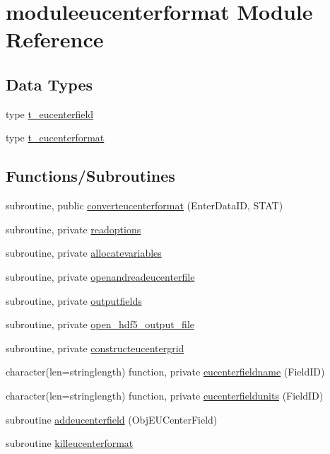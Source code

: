 \hypertarget{namespacemoduleeucenterformat}{}\section{moduleeucenterformat Module Reference}
\label{namespacemoduleeucenterformat}
\subsection*{Data Types}
\begin{DoxyCompactItemize}
\item 
type \mbox{\hyperlink{structmoduleeucenterformat_1_1t__eucenterfield}{t\+\_\+eucenterfield}}
\item 
type \mbox{\hyperlink{structmoduleeucenterformat_1_1t__eucenterformat}{t\+\_\+eucenterformat}}
\end{DoxyCompactItemize}
\subsection*{Functions/\+Subroutines}
\begin{DoxyCompactItemize}
\item 
subroutine, public \mbox{\hyperlink{namespacemoduleeucenterformat_aa12d33b733be8e990e1050000343f7ed}{converteucenterformat}} (Enter\+Data\+ID, S\+T\+AT)
\item 
subroutine, private \mbox{\hyperlink{namespacemoduleeucenterformat_a7195020c940588617c0bf9bb335b07f9}{readoptions}}
\item 
subroutine, private \mbox{\hyperlink{namespacemoduleeucenterformat_a363ea37d06e552dd3191189238b401fc}{allocatevariables}}
\item 
subroutine, private \mbox{\hyperlink{namespacemoduleeucenterformat_a82e8b7c6bd570b0435fd58801a248e44}{openandreadeucenterfile}}
\item 
subroutine, private \mbox{\hyperlink{namespacemoduleeucenterformat_afb336c51f13a7459800b82f45a13e498}{outputfields}}
\item 
subroutine, private \mbox{\hyperlink{namespacemoduleeucenterformat_a8e53ba660eb9e964abe2de913b95c20f}{open\+\_\+hdf5\+\_\+output\+\_\+file}}
\item 
subroutine, private \mbox{\hyperlink{namespacemoduleeucenterformat_a95230a7fb149b9fbacb2fdd6d4bc776d}{constructeucentergrid}}
\item 
character(len=stringlength) function, private \mbox{\hyperlink{namespacemoduleeucenterformat_a2270a8364737dc694ff865c8eb8a8788}{eucenterfieldname}} (Field\+ID)
\item 
character(len=stringlength) function, private \mbox{\hyperlink{namespacemoduleeucenterformat_a96acc03f8210b20aa7bb87e45e512333}{eucenterfieldunits}} (Field\+ID)
\item 
subroutine \mbox{\hyperlink{namespacemoduleeucenterformat_ae1108c503ba34758ca91c475847a0a95}{addeucenterfield}} (Obj\+E\+U\+Center\+Field)
\item 
subroutine \mbox{\hyperlink{namespacemoduleeucenterformat_a86566f77f24a79f436c69106f22fe5f7}{killeucenterformat}}
\end{DoxyCompactItemize}
